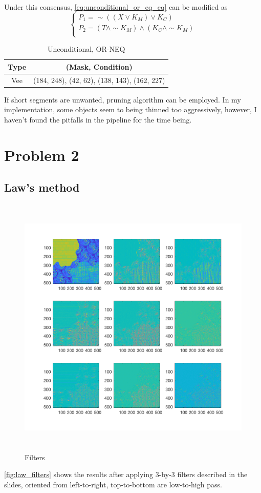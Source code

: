 \documentclass[12pt]{article}
\begin{document}
Under this consensus, \autoref{eq:unconditional_or_eq_eq} can be modified as
\begin{equation}
\begin{cases}
	P_1 = \sim ((X \vee K_M) \vee K_C) \\
	P_2 = (T \wedge \sim K_M) \wedge (K_C \wedge \sim K_M)\\
\end{cases}
\label{eq:unconditional_or_eq_eq}
\end{equation}

\begin{table}[H]
\caption{Unconditional, OR-NEQ}
	\centering
	\begin{tabular}{c|c}	
	Type & (Mask, Condition) \\
	\hline
	\hline
	Vee & (184, 248), (42, 62), (138, 143), (162, 227) \\
	\end{tabular}
\end{table}

If short segments are unwanted, pruning algorithm can be employed. In my implementation, some objects seem to being thinned too aggressively, however, I haven't found the pitfalls in the pipeline for the time being. 

\section*{Problem 2}
\subsection*{Law's method}
\begin{figure}[H]
    \centering
    \includegraphics[height=5in]{images/M}
    \caption{Filters}
    \label{fig:law_filters}
\end{figure}
\autoref{fig:law_filters} shows the results after applying 3-by-3 filters described in the slides, oriented from left-to-right, top-to-bottom are low-to-high pass.
\end{document}
